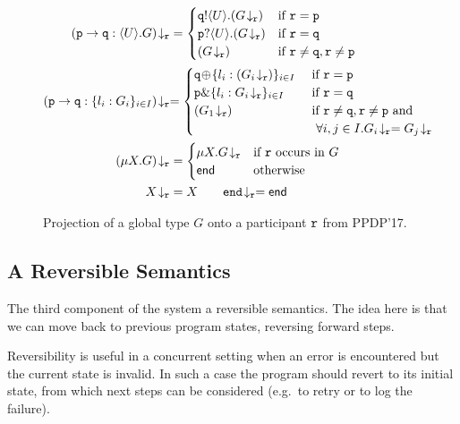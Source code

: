 \documentclass[runningheads,plain]{llncs}
\begin{document}
\begin{figure}[]
{
\begin{align*}
\tproj{(\gtcom{p}{q}{U}{G})}{\gpart{r}} & = 
\begin{cases}
\ltout{q}{U}{(\tproj{G}{\gpart{r}})} & \text{if $\gpart{r} = \gpart{p}$} \\
\ltinp{p}{U}{(\tproj{G}{\gpart{r}})} & \text{if $\gpart{r} = \gpart{q}$} \\
(\tproj{G}{\gpart{r}}) &  \text{if $\gpart{r} \neq \gpart{q}, \gpart{r} \neq \gpart{p}$}
\end{cases}
\\
\tproj{(\gtcho{p}{q}{l_i}{G_i})}{\gpart{r}}  
& 
{= 
\begin{cases}
\ltsel{q}{\lbl_i}{(\tproj{G_i}{\gpart{r}})}{i}{I}  & \text{ if $\gpart{r} = \gpart{p}$} \\
\ltbra{p}{\lbl_i}{\tproj{G_i}{\gpart{r}}}{i}{I}  & \text{ if $\gpart{r} = \gpart{q}$} \\
(\tproj{{G_1}}{\gpart{r}}) &  \text{ if $\gpart{r} \neq \gpart{q}, \gpart{r} \neq \gpart{p}$ and} \\ 
& \text{~~$\forall i, j \in I. \tproj{{G_i}}{\gpart{r}} = \tproj{{G_j}}{\gpart{r}}$}
\end{cases}
}
\\
\tproj{(\mu X. G)}{\gpart{r}} &= 
\begin{cases}
\mu X. \tproj{G}{\gpart{r}} & \text{if $\gpart{r}$ occurs in $G$}
\\
\lend & \text{otherwise}
\end{cases}
\\
\tproj{X}{\gpart{r}} & = X
\qquad
\tproj{\gend}{\gpart{r}} = \lend
\end{align*}
}
\vspace{-4mm}
\caption{Projection of a global type $G$ onto a participant $\mathtt{r}$ from PPDP'17.\label{f:proj}}
\end{figure}

\subsection{A Reversible Semantics}\label{a-reversible-semantics}

The third component of the system a reversible semantics. The idea here
is that we can move back to previous program states, reversing forward
steps.

Reversibility is useful in a concurrent setting when an error is
encountered but the current state is invalid. In such a case the program
should revert to its initial state, from which next steps can be
considered (e.g.~to retry or to log the failure).
\end{document}
